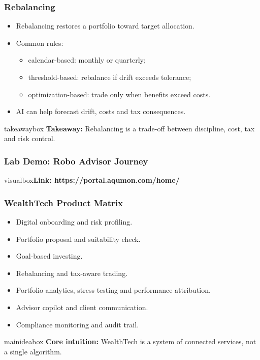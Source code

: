 \documentclass[aspectratio=169,12pt]{beamer}
\newcommand{\currentframetitle}{}
\newcommand{\slideTitle}[1]{\gdef\currentframetitle{#1}\frametitle{#1}}
\newcommand{\mainidea}[1]{%
  \vspace{0.08cm}
  \begin{beamercolorbox}[wd=\linewidth,rounded=true,sep=0.18cm]{mainideabox}
    \small\textbf{Core intuition:} #1
  \end{beamercolorbox}%
}
\newcommand{\takeaway}[1]{%
  \vspace{0.08cm}
  \begin{beamercolorbox}[wd=\linewidth,rounded=true,sep=0.18cm]{takeawaybox}
    \small\textbf{Takeaway:} #1
  \end{beamercolorbox}%
}
\begin{document}
\begin{frame}
\slideTitle{Rebalancing}
\begin{itemize}
  \item Rebalancing restores a portfolio toward target allocation.
  \item Common rules:
  \begin{itemize}
    \item calendar-based: monthly or quarterly;
    \item threshold-based: rebalance if drift exceeds tolerance;
    \item optimization-based: trade only when benefits exceed costs.
  \end{itemize}
  \item AI can help forecast drift, costs and tax consequences.
\end{itemize}
\takeaway{Rebalancing is a trade-off between discipline, cost, tax and risk control.}
\end{frame}

\begin{frame}
\slideTitle{Lab Demo: Robo Advisor Journey}
\footnotesize
\begin{beamercolorbox}[wd=\linewidth,rounded=true,sep=0.12cm]{visualbox}\scriptsize\textbf{Link: https://portal.aqumon.com/home/} \end{beamercolorbox}
\end{frame}


\begin{frame}
\slideTitle{WealthTech Product Matrix}
\begin{itemize}
  \item Digital onboarding and risk profiling.
  \item Portfolio proposal and suitability check.
  \item Goal-based investing.
  \item Rebalancing and tax-aware trading.
  \item Portfolio analytics, stress testing and performance attribution.
  \item Advisor copilot and client communication.
  \item Compliance monitoring and audit trail.
\end{itemize}
\mainidea{WealthTech is a system of connected services, not a single algorithm.}
\end{frame}
\end{document}
